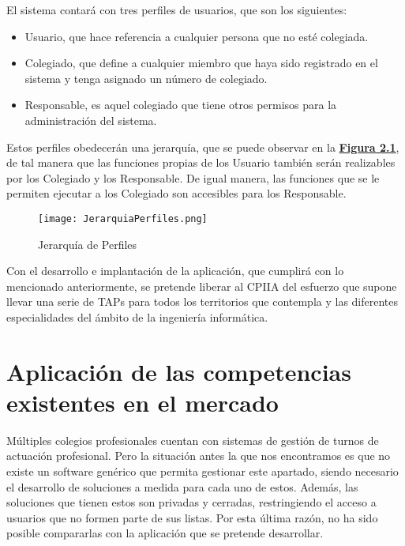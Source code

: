 El sistema contará con tres perfiles de usuarios, que son los siguientes:
\begin{itemize}
	\item Usuario, que hace referencia a cualquier persona que no esté colegiada.
	\item Colegiado, que define a cualquier miembro que haya sido registrado en el sistema y tenga asignado un número de colegiado.
	\item Responsable, es aquel colegiado que tiene otros permisos para la administración del sistema. \\
\end{itemize}


Estos perfiles obedecerán una jerarquía, que se puede observar en la \textbf{\hyperref[fig:jerarquiaPerfiles]{Figura 2.1}}, de tal manera que las funciones propias de los Usuario también serán realizables por los Colegiado y los Responsable. De igual manera, las funciones que se le permiten ejecutar a los Colegiado son accesibles para los Responsable.

\begin{figure}[!htbp]
  \centering
  \texttt{[image: JerarquiaPerfiles.png]}
  \caption{Jerarquía de Perfiles}
  \label{fig:jerarquiaPerfiles}
\end{figure}
\FloatBarrier

Con el desarrollo e implantación de la aplicación, que cumplirá con lo mencionado anteriormente, se pretende liberar al CPIIA del esfuerzo que supone llevar una serie de TAPs para todos los territorios que contempla y las diferentes especialidades del ámbito de la ingeniería informática.


\section{Aplicación de las competencias existentes en el mercado}
Múltiples colegios profesionales cuentan con sistemas de gestión de turnos de actuación profesional. Pero la situación antes la que nos encontramos es que no existe un software genérico que permita gestionar este apartado, siendo necesario el desarrollo de soluciones a medida para cada uno de estos. Además, las soluciones que tienen estos son privadas y cerradas, restringiendo el acceso a usuarios que no formen parte de sus listas. Por esta última razón, no ha sido posible compararlas con la aplicación que se pretende desarrollar.
